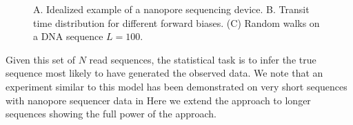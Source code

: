 \documentclass{biophys_letter}
\begin{document}
\twocolumn
\begin{figure}\vspace*{3pt}
\caption{A. Idealized example of a nanopore sequencing device. B. Transit time distribution for different forward biases. (C) Random walks on a DNA sequence $L=100$.}
\label{fig:fig1}
\end{figure}

Given this set of $N$ read sequences, the statistical task is to infer the true sequence most likely to have generated the observed data.
We note that an experiment similar to this model has been demonstrated on very short sequences with nanopore sequencer data in \cite{Ohshiro2012}
Here we extend the approach to longer sequences showing the full power of the approach.
\end{document}
